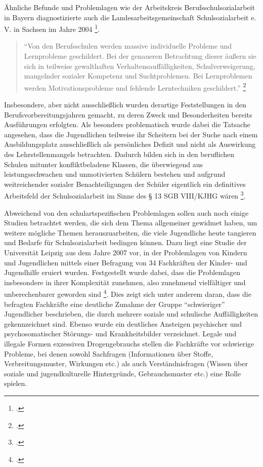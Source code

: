 Ähnliche Befunde und Problemlagen wie der Arbeitskreis Berufsschulsozialarbeit in Bayern diagnostizierte auch die Landesarbeitsgemeinschaft Schulsozialarbeit e. V. in Sachsen im Jahre 2004 \footcite[18]{LSS2004}. 

\begin{quotation}
\noindent
"`Von den Berufsschulen werden massive individuelle Probleme und Lernprobleme geschildert. Bei der genaueren Betrachtung dieser äußern sie sich in teilweise gewalthaften Verhaltensauffälligkeiten, Schulverweigerung, mangelnder sozialer Kompetenz und Suchtproblemen. Bei Lernproblemen werden Motivationsprobleme und fehlende Lerntechniken geschildert."' \footcite[18]{LSS2004}
\end{quotation}

\noindent
Insbesondere, aber nicht ausschließlich wurden derartige Feststellungen in den Berufsvorbereitungsjahren gemacht, zu deren Zweck und Besonderheiten bereits Ausführungen erfolgten. Als besonders problematisch wurde dabei die Tatsache angesehen, dass die Jugendlichen teilweise ihr Scheitern bei der Suche nach einem Ausbildungsplatz ausschließlich als persönliches Defizit und nicht als Auswirkung des Lehrstellenmangels betrachten. Dadurch bilden sich in den beruflichen Schulen mitunter konfliktbeladene Klassen, die überwiegend aus leistungsschwachen und unmotivierten Schülern bestehen und aufgrund weitreichender sozialer Benachteiligungen der Schüler eigentlich ein definitives Arbeitsfeld der Schulsozialarbeit im Sinne des § 13 SGB VIII/KJHG wären \footcite[18]{LSS2004}.

Abweichend von den schulartspezifischen Problemlagen sollen auch noch einige Studien betrachtet werden, die sich dem Thema allgemeiner gewidmet haben, um weitere mögliche Themen herauszuarbeiten, die viele Jugendliche heute tangieren und Bedarfe für Schulsozialarbeit bedingen können. Dazu liegt eine Studie der Universität Leipzig aus dem Jahre 2007 vor, in der Problemlagen von Kindern und Jugendlichen mittels einer Befragung von 34 Fachkräften der Kinder- und Jugendhilfe eruiert wurden. Festgestellt wurde dabei, dass die Problemlagen insbesondere in ihrer Komplexität zunehmen, also zunehmend vielfältiger und unberechenbarer geworden sind \footcite[vgl.][142ff]{UniversitaetLeipzig2007}. Dies zeigt sich unter anderem daran, dass die befragten Fachkräfte eine deutliche Zunahme der Gruppe "`schwieriger"' Jugendlicher beschrieben, die durch mehrere soziale und schulische Auffälligkeiten gekennzeichnet sind. Ebenso wurde ein deutliches Ansteigen psychischer und psychosomatischer Störungs- und Krankheitsbilder verzeichnet. Legale und illegale Formen exzessiven Drogengebrauchs stellen die Fachkräfte vor schwierige Probleme, bei denen sowohl Sachfragen (Informationen über Stoffe, Verbreitungsmuster, Wirkungen etc.) als auch Verständnisfragen (Wissen über soziale und jugendkulturelle Hintergründe, Gebrauchsmuster etc.) eine Rolle spielen. 


